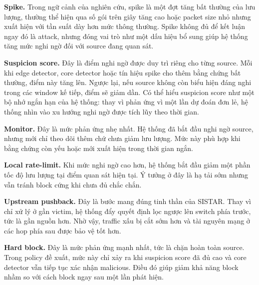 \textbf{Spike.} Trong ngữ cảnh của nghiên cứu, spike là một đợt tăng bất thường của lưu lượng, thường thể hiện qua số gói trên giây tăng cao hoặc packet size nhỏ nhưng xuất hiện với tần suất dày hơn mức thông thường. Spike không đủ để kết luận ngay đó là attack, nhưng đóng vai trò như một dấu hiệu bổ sung giúp hệ thống tăng mức nghi ngờ đối với source đang quan sát.

\textbf{Suspicion score.} Đây là điểm nghi ngờ được duy trì riêng cho từng source. Mỗi khi edge detector, core detector hoặc tín hiệu spike cho thêm bằng chứng bất thường, điểm này tăng lên. Ngược lại, nếu source không còn biểu hiện đáng nghi trong các window kế tiếp, điểm sẽ giảm dần. Có thể hiểu suspicion score như một bộ nhớ ngắn hạn của hệ thống: thay vì phản ứng vì một lần dự đoán đơn lẻ, hệ thống nhìn vào xu hướng nghi ngờ được tích lũy theo thời gian.

\textbf{Monitor.} Đây là mức phản ứng nhẹ nhất. Hệ thống đã bắt đầu nghi ngờ source, nhưng mới chỉ theo dõi thêm chứ chưa giảm lưu lượng. Mức này phù hợp khi bằng chứng còn yếu hoặc mới xuất hiện trong thời gian ngắn.

\textbf{Local rate-limit.} Khi mức nghi ngờ cao hơn, hệ thống bắt đầu giảm một phần tốc độ lưu lượng tại điểm quan sát hiện tại. Ý tưởng ở đây là hạ tải sớm nhưng vẫn tránh block cứng khi chưa đủ chắc chắn.

\textbf{Upstream pushback.} Đây là bước mang đúng tinh thần của SISTAR. Thay vì chỉ xử lý ở gần victim, hệ thống đẩy quyết định lọc ngược lên switch phía trước, tức là gần nguồn hơn. Nhờ vậy, traffic xấu bị cắt sớm hơn và tài nguyên mạng ở các hop phía sau được bảo vệ tốt hơn.

\textbf{Hard block.} Đây là mức phản ứng mạnh nhất, tức là chặn hoàn toàn source. Trong policy đề xuất, mức này chỉ xảy ra khi suspicion score đã đủ cao và core detector vẫn tiếp tục xác nhận malicious. Điều đó giúp giảm khả năng block nhầm so với cách block ngay sau một lần phát hiện.

